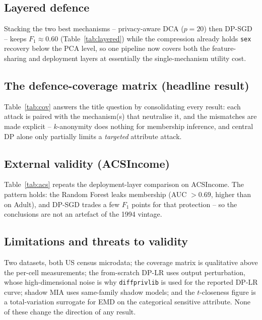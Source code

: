 \documentclass[11pt,a4paper]{article}
\newcommand{\cmark}{\textcolor{accent}{\textbf{\checkmark}}}
\newcommand{\xmark}{\textcolor{red!70!black}{\textbf{\texttimes}}}
\newcommand{\pmark}{\textcolor{orange!80!black}{\textbf{$\sim$}}}
\begin{document}
\subsection{Layered defence}\label{sec:layered}
Stacking the two best mechanisms -- privacy-aware DCA ($p{=}20$) then DP-SGD --
keeps $F_1\approx 0.60$ (Table~\ref{tab:layered}) while the compression already
holds \texttt{sex} recovery below the PCA level, so one pipeline now covers both
the feature-sharing and deployment layers at essentially the single-mechanism
utility cost.
\begin{table}[htbp]\centering\caption{Layered privacy-aware DCA + DP-SGD.}\label{tab:layered}

\end{table}

\subsection{The defence-coverage matrix (headline result)}
Table~\ref{tab:cov} answers the title question by consolidating every result:
each attack is paired with the mechanism(s) that neutralise it, and the
mismatches are made explicit -- $k$-anonymity does nothing for membership
inference, and central DP alone only partially limits a \emph{targeted} attribute
attack.
\begin{table}[htbp]\centering\caption{Defence-coverage matrix (\cmark{} stops, \pmark{} partial, \xmark{} no effect).}\label{tab:cov}

\end{table}

\subsection{External validity (ACSIncome)}
Table~\ref{tab:acs} repeats the deployment-layer comparison on ACSIncome. The
pattern holds: the Random Forest leaks membership (AUC $>0.69$, higher than on
Adult), and DP-SGD trades a few $F_1$ points for that protection -- so the
conclusions are not an artefact of the 1994 vintage.
\begin{table}[htbp]\centering\caption{ACSIncome (California, 2018) replication.}\label{tab:acs}

\end{table}

\subsection{Limitations and threats to validity}
Two datasets, both US census microdata; the coverage matrix is qualitative above
the per-cell measurements; the from-scratch DP-LR uses output perturbation, whose
high-dimensional noise is why \texttt{diffprivlib} is used for the reported DP-LR
curve; shadow MIA uses same-family shadow models; and the $t$-closeness figure is
a total-variation surrogate for EMD on the categorical sensitive attribute.
None of these change the direction of any result.
\end{document}
